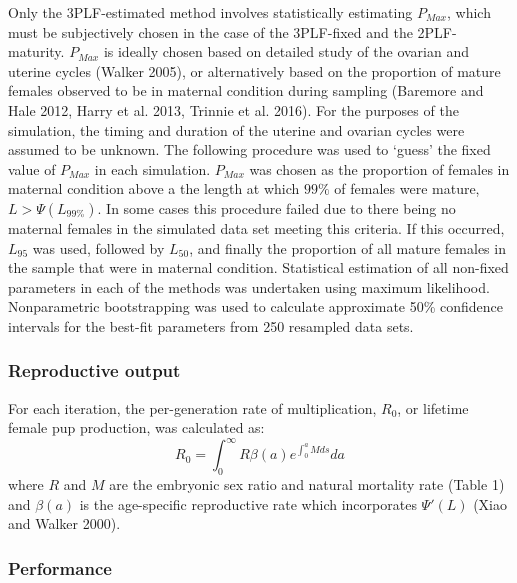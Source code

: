 \documentclass[
]{article}
\begin{document}
Only the 3PLF-estimated method involves statistically estimating \(P_{Max}\), which must be subjectively chosen in the case of the 3PLF-fixed and the 2PLF-maturity. \(P_{Max}\) is ideally chosen based on detailed study of the ovarian and uterine cycles (Walker 2005), or alternatively based on the proportion of mature females observed to be in maternal condition during sampling (Baremore and Hale 2012, Harry et al. 2013, Trinnie et al. 2016). For the purposes of the simulation, the timing and duration of the uterine and ovarian cycles were assumed to be unknown. The following procedure was used to `guess' the fixed value of \(P_{Max}\) in each simulation. \(P_{Max}\) was chosen as the proportion of females in maternal condition above a the length at which \(99\%\) of females were mature, \(L > \Psi(L_{99\%})\). In some cases this procedure failed due to there being no maternal females in the simulated data set meeting this criteria. If this occurred, \(L_{95}\) was used, followed by \(L_{50}\), and finally the proportion of all mature females in the sample that were in maternal condition. Statistical estimation of all non-fixed parameters in each of the methods was undertaken using maximum likelihood. Nonparametric bootstrapping was used to calculate approximate 50\% confidence intervals for the best-fit parameters from 250 resampled data sets.

\subsubsection{Reproductive output}\label{reproductive-output}

For each iteration, the per-generation rate of multiplication, \(R_0\), or lifetime female pup production, was calculated as: \[R_0 =\int_{0}^{\infty}R\beta(a)e^{\int_{0}^{a}M ds}da \] where \(R\) and \(M\) are the embryonic sex ratio and natural mortality rate (Table 1) and \(\beta(a)\) is the age-specific reproductive rate which incorporates \(\Psi'(L)\) (Xiao and Walker 2000).

\subsubsection{Performance}\label{performance}
\end{document}
